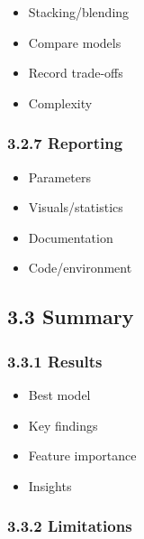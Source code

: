 \documentclass[
]{article}
\providecommand{\tightlist}{%
  \setlength{\itemsep}{0pt}\setlength{\parskip}{0pt}}
\begin{document}
\begin{itemize}
\tightlist
\item
  Stacking/blending\\
\item
  Compare models\\
\item
  Record trade-offs\\
\item
  Complexity \newpage
\end{itemize}

\subsubsection{3.2.7 Reporting}\label{reporting}

\begin{itemize}
\tightlist
\item
  Parameters\\
\item
  Visuals/statistics\\
\item
  Documentation\\
\item
  Code/environment \newpage
\end{itemize}

\subsection{3.3 Summary}\label{summary}

\newpage

\subsubsection{3.3.1 Results}\label{results}

\begin{itemize}
\tightlist
\item
  Best model\\
\item
  Key findings\\
\item
  Feature importance\\
\item
  Insights \newpage
\end{itemize}

\subsubsection{3.3.2 Limitations}\label{limitations}
\end{document}
